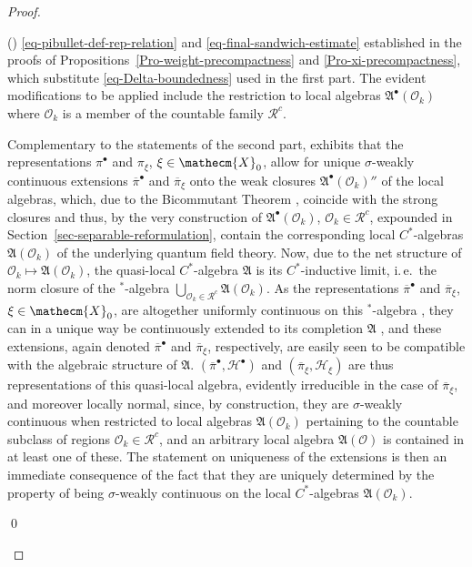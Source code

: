 \documentclass[11pt,twoside,openright]{report}
\theoremstyle{definition}
\theoremstyle{plain}
\theoremstyle{remark}
\theoremstyle{assumption}
\newcommand{\Xecm}{\mathecm{X}}
\newcommand{\Afrak}{\mathfrak{A}}
\newcommand{\Hscr}{\mathscr{H}}
\newcommand{\Oscr}{\mathscr{O}}
\newcommand{\pibar}{\overline{\pi}}
\newcommand{\AO}{\mathfrak{A} ( \mathscr{O} )}
\newcommand{\AOk}{\mathfrak{A} ( \mathscr{O}_k )}
\newcommand{\Rcount}{\mathscr{R}^c}
\newcommand{\Hbullet}{\mathscr{H}^\bullet}
\newcommand{\AbulletOk}{\mathfrak{A}^\bullet ( \mathscr{O}_k )}
\newcounter{proofitem}
\newenvironment{prooflist}{\begin{list}{(\roman{proofitem})}%
  {\usecounter{proofitem} \setlength{\topsep}{0ex}%
   \setlength{\parsep}{0.2ex} \setlength{\itemsep}{0.4ex}%
   \setlength{\leftmargin}{0em} \setlength{\itemindent}{0.5em}%
   \setlength{\listparindent}{1em}}}{\qed \end{list}}
\begin{document}
\begin{proof}
\begin{prooflist}
    \eqref{eq-pibullet-def-rep-relation} and
    \eqref{eq-final-sandwich-estimate} established in the proofs of
    Propositions~\ref{Pro-weight-precompactness} and
    \ref{Pro-xi-precompactness}, which substitute
    \eqref{eq-Delta-boundedness} used in the first part. The evident
    modifications to be applied include the restriction to local
    algebras $\AbulletOk$ where $\Oscr_k$ is a member of the countable
    family $\Rcount$.
  \item Complementary to the statements of the second part,
    \cite[Lemma~10.1.10]{kadison/ringrose:1986} exhibits that the
    representations $\pi^\bullet$ and $\pi_\xi$, $\xi \in \Xecm_0$,
    allow for unique $\sigma$-weakly continuous extensions
    $\pibar^\bullet$ and $\pibar_\xi$ onto the weak closures
    $\AbulletOk''$ \cite[Corollary~2.4.15]{bratteli/robinson:1987} of
    the local algebras, which, due to the Bicommutant Theorem
    \cite[Theorem~2.4.11]{bratteli/robinson:1987}, coincide with the
    strong closures and thus, by the very construction of
    $\AbulletOk$, $\Oscr_k \in \Rcount$, expounded in
    Section~\ref{sec-separable-reformulation}, contain the
    corresponding local $C^*$-algebras $\AOk$ of the underlying
    quantum field theory. Now, due to the net structure of $\Oscr_k
    \mapsto \AOk$, the quasi-local $C^*$-algebra $\Afrak$ is its
    $C^*$-inductive limit, i.\,e.~the norm closure of the $^*$-algebra
    $\bigcup_{\Oscr_k \in \Rcount} \AOk$. As the representations
    $\pibar^\bullet$ and $\pibar_\xi$, $\xi \in \Xecm_0$, are
    altogether uniformly continuous on this $^*$-algebra
    \cite[Theorem~1.5.7]{pedersen:1979}, they can in a unique way be
    continuously extended to its completion $\Afrak$ \cite[Chapter
    One, \S\,5,\,4.(4)]{koethe:1983}, and these extensions, again
    denoted $\pibar^\bullet$ and $\pibar_\xi$, respectively, are
    easily seen to be compatible with the algebraic structure of
    $\Afrak$. $( \pibar^\bullet , \Hbullet )$ and $( \pibar_\xi ,
    \Hscr_\xi )$ are thus representations of this quasi-local algebra,
    evidently irreducible in the case of $\pibar_\xi$, and moreover
    locally normal, since, by construction, they are $\sigma$-weakly
    continuous when restricted to local algebras $\AOk$ pertaining to
    the countable subclass of regions $\Oscr_k \in \Rcount$, and an
    arbitrary local algebra $\AO$ is contained in at least one of
    these. The statement on uniqueness of the extensions is then an
    immediate consequence of the fact that they are uniquely
    determined by the property of being $\sigma$-weakly continuous on
    the local $C^*$-algebras $\AOk$.


\end{prooflist}
\end{proof}
\end{document}
